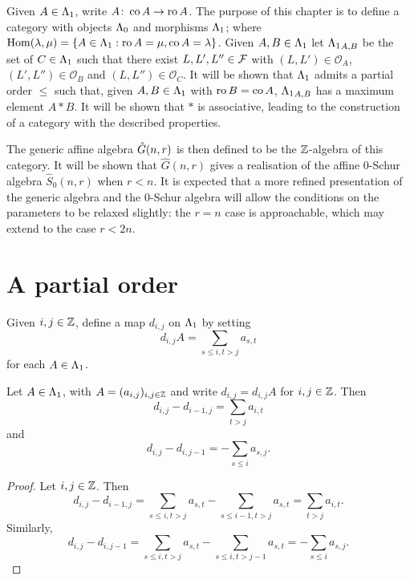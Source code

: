 \documentclass[a4paper, 11pt]{report}
\begin{document}
Given $A\in{\Lambda_1}$, write $A\colon\operatorname{co}{A}\to\operatorname{ro}{A}$. The purpose of this chapter is to define a category with objects ${\Lambda_0}$ and morphisms ${\Lambda_1}$; where $\operatorname{Hom}(\lambda,\mu) = \{A\in{\Lambda_1}: \operatorname{ro}{A}=\mu,\operatorname{co}{A}=\lambda\}$. Given $A,B\in{\Lambda_1}$ let ${\Lambda_1}_{A,B}$ be the set of $C\in{\Lambda_1}$ such that there exist $L,L',L''\in\mathcal{F}$ with $(L,L')\in\mathcal{O}_A$, $(L',L'')\in\mathcal{O}_B$ and $(L,L'')\in\mathcal{O}_C$. It will be shown that ${\Lambda_1}$ admits a partial order $\le$ such that, given $A,B\in{\Lambda_1}$ with $\operatorname{ro}{B}=\operatorname{co}{A}$, ${\Lambda_1}_{A,B}$ has a maximum element $A\ast B$. It will be shown that $\ast$ is associative, leading to the construction of a category with the described properties.

The generic affine algebra $\hat{G}(n,r)$ is then defined to be the $\mathbb{Z}$-algebra of this category. It will be shown that $\hat{G}(n,r)$ gives a realisation of the affine $0$-Schur algebra $\hat{S}_0(n,r)$ when $r<n$. It is expected that a more refined presentation of the generic algebra and the $0$-Schur algebra will allow the conditions on the parameters to be relaxed slightly: the $r=n$ case is approachable, which may extend to the case $r<2n$.

\section{A partial order}

Given $i,j\in\mathbb{Z}$, define a map $d_{i,j}$ on ${\Lambda_1}$ by setting
\begin{equation*}
d_{i,j}A = \sum_{s\le i,t>j} a_{s,t}
\end{equation*}
for each $A\in{\Lambda_1}$.

\begin{lemma}\label{lemma:differentials}
Let $A\in{\Lambda_1}$, with $A=(a_{i,j})_{i,j\in\mathbb{Z}}$ and write $d_{i,j} = d_{i,j}A$ for $i,j\in\mathbb{Z}$. Then
\begin{equation*}
d_{i,j} - d_{i-1,j} = \sum_{t>j}a_{i,t}
\end{equation*}
and
\begin{equation*}
d_{i,j}-d_{i,j-1} = - \sum_{s\le i}a_{s,j}.
\end{equation*}
\end{lemma}

\begin{proof}
Let $i,j\in\mathbb{Z}$. Then
\begin{equation*}
d_{i,j} - d_{i-1,j} = \sum_{s\le i,t>j}a_{s,t} - \sum_{s\le i-1,t>j}a_{s,t} = \sum_{t>j}a_{i,t}.
\end{equation*}
Similarly,
\begin{equation*}
d_{i,j}-d_{i,j-1} = \sum_{s\le i,t>j}a_{s,t} - \sum_{s\le i,t>j-1}a_{s,t} = -\sum_{s\le i}a_{s,j}.
\end{equation*}
\end{proof}
\end{document}

